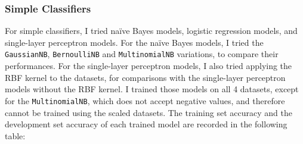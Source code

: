 \documentclass[12pt,twoside,a4paper]{article}
\begin{document}
\subsubsection{Simple Classifiers}

For simple classifiers, I tried naïve Bayes models, logistic regression models, and single-layer perceptron models. For the naïve Bayes models, I tried the \texttt{GaussianNB}, \texttt{BernoulliNB} and \texttt{MultinomialNB} variations, to compare their performances. For the single-layer perceptron models, I also tried applying the RBF kernel to the datasets, for comparisons with the single-layer perceptron models without the RBF kernel. I trained those models on all 4 datasets, except for the \texttt{MultinomialNB}, which does not accept negative values, and therefore cannot be trained using the scaled datasets. The training set accuracy and the development set accuracy of each trained model are recorded in the following table:
\end{document}
